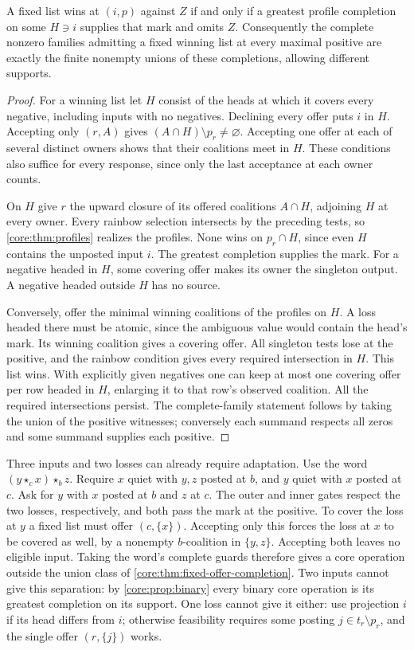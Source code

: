 \begin{theorem}
\label{core:thm:fixed-offer-completion}
A fixed list wins at $(i,p)$ against $Z$ if and only if a greatest
profile completion on some $H\ni i$ supplies that mark and omits $Z$.
Consequently the complete nonzero families admitting a fixed winning
list at every maximal positive are exactly the finite nonempty unions
of these completions, allowing different supports.
\end{theorem}
\begin{proof}
For a winning list let $H$ consist of the heads at which it covers
every negative, including inputs with no negatives. Declining every
offer puts $i$ in $H$. Accepting only $(r,A)$ gives
$(A\cap H)\setminus p_r\ne\varnothing$. Accepting one offer at each
of several distinct owners shows that their coalitions meet in $H$.
These conditions also suffice for every response, since only the last
acceptance at each owner counts.

On $H$ give $r$ the upward closure of its offered coalitions $A\cap H$,
adjoining $H$ at every owner. Every rainbow selection intersects by
the preceding tests, so \cref{core:thm:profiles} realizes the
profiles. None wins on $p_r\cap H$, since even $H$ contains the
unposted input $i$. The greatest completion supplies the mark.
For a negative headed in $H$, some covering offer makes its owner
the singleton output. A negative headed outside $H$ has no source.

Conversely, offer the minimal winning coalitions of the profiles on
$H$. A loss headed there must be atomic, since the ambiguous value
would contain the head's mark. Its winning coalition gives a covering
offer. All singleton tests lose at the positive, and the rainbow
condition gives every required intersection in $H$. This list wins.
With explicitly given negatives one can keep at most one covering
offer per row headed in $H$, enlarging it to that row's observed
coalition. All the required intersections persist. The complete-family
statement follows by taking the union of the positive witnesses;
conversely each summand respects all zeros and some summand supplies
each positive.
\end{proof}

Three inputs and two losses can already require adaptation. Use
the word $(y\star_c x)\star_b z$. Require $x$ quiet with $y,z$
posted at $b$, and $y$ quiet with $x$ posted at $c$. Ask for $y$
with $x$ posted at $b$ and $z$ at $c$. The outer and inner gates
respect the two losses, respectively, and both pass the mark at the
positive. To cover the loss at $y$ a fixed list must offer
$(c,\{x\})$. Accepting only this forces the loss at $x$ to be
covered as well, by a nonempty $b$-coalition in $\{y,z\}$. Accepting
both leaves no eligible input. Taking the word's complete guards
therefore gives a core operation outside the union class of
\cref{core:thm:fixed-offer-completion}. Two inputs cannot give this
separation: by \cref{core:prop:binary} every binary core operation
is its greatest completion on its support. One loss cannot give it
either: use projection $i$ if its head differs from $i$; otherwise
feasibility requires some posting $j\in t_r\setminus p_r$, and the
single offer $(r,\{j\})$ works.

